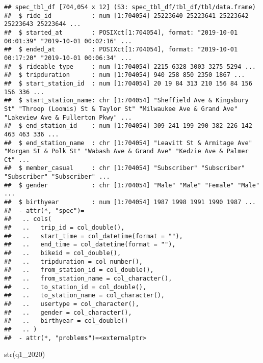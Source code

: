 \documentclass[
]{article}
\newenvironment{Shaded}{\begin{snugshade}}{\end{snugshade}}
\newcommand{\FunctionTok}[1]{\textcolor[rgb]{0.00,0.00,0.00}{#1}}
\newcommand{\NormalTok}[1]{#1}
\begin{document}
\begin{verbatim}
## spec_tbl_df [704,054 x 12] (S3: spec_tbl_df/tbl_df/tbl/data.frame)
##  $ ride_id           : num [1:704054] 25223640 25223641 25223642 25223643 25223644 ...
##  $ started_at        : POSIXct[1:704054], format: "2019-10-01 00:01:39" "2019-10-01 00:02:16" ...
##  $ ended_at          : POSIXct[1:704054], format: "2019-10-01 00:17:20" "2019-10-01 00:06:34" ...
##  $ rideable_type     : num [1:704054] 2215 6328 3003 3275 5294 ...
##  $ tripduration      : num [1:704054] 940 258 850 2350 1867 ...
##  $ start_station_id  : num [1:704054] 20 19 84 313 210 156 84 156 156 336 ...
##  $ start_station_name: chr [1:704054] "Sheffield Ave & Kingsbury St" "Throop (Loomis) St & Taylor St" "Milwaukee Ave & Grand Ave" "Lakeview Ave & Fullerton Pkwy" ...
##  $ end_station_id    : num [1:704054] 309 241 199 290 382 226 142 463 463 336 ...
##  $ end_station_name  : chr [1:704054] "Leavitt St & Armitage Ave" "Morgan St & Polk St" "Wabash Ave & Grand Ave" "Kedzie Ave & Palmer Ct" ...
##  $ member_casual     : chr [1:704054] "Subscriber" "Subscriber" "Subscriber" "Subscriber" ...
##  $ gender            : chr [1:704054] "Male" "Male" "Female" "Male" ...
##  $ birthyear         : num [1:704054] 1987 1998 1991 1990 1987 ...
##  - attr(*, "spec")=
##   .. cols(
##   ..   trip_id = col_double(),
##   ..   start_time = col_datetime(format = ""),
##   ..   end_time = col_datetime(format = ""),
##   ..   bikeid = col_double(),
##   ..   tripduration = col_number(),
##   ..   from_station_id = col_double(),
##   ..   from_station_name = col_character(),
##   ..   to_station_id = col_double(),
##   ..   to_station_name = col_character(),
##   ..   usertype = col_character(),
##   ..   gender = col_character(),
##   ..   birthyear = col_double()
##   .. )
##  - attr(*, "problems")=<externalptr>
\end{verbatim}

\begin{Shaded}
\begin{Highlighting}[]
\FunctionTok{str}\NormalTok{(q1\_2020)}
\end{Highlighting}
\end{Shaded}
\end{document}
